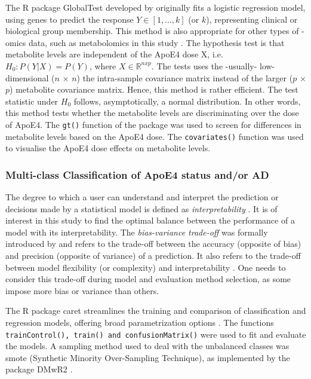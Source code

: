 \documentclass{amsart}
\theoremstyle{plain}
\begin{document}
The R package \textsf{GlobalTest} \cite{Goeman2004AOutcome, Goeman2006TestingAlternative, Goeman2023ThePackage} developed by \citeauthor{Goeman2004AOutcome} originally fits a logistic regression model, using genes to predict the response $Y \in [1,..., k]$ (or $k$), representing clinical or biological group membership. This method is also appropriate for other types of -omics data, such as metabolomics in this study \cite{Goeman2023ThePackage}.
The hypothesis test is that metabolite levels are independent of the ApoE4 dose X, i.e. $H_0 : P(Y|X) = P(Y)$, where $X \in \mathbb{R}^{n x p}$. The tests uses the -usually- low-dimensional ($n$ × $n$) the intra-sample covariance matrix instead of the larger ($p$ × $p$) metabolite covariance matrix. Hence, this method is rather efficient. The test statistic under $H_0$ follows, asymptotically, a normal distribution. In other words, this method tests whether the metabolite levels are discriminating over the dose of ApoE4. The \texttt{gt()} function of the package was used to screen for differences in metabolite levels based on the ApoE4 dose. The \texttt{covariates()} function was used to visualise the ApoE4 dose effects on metabolite levels.

\subsubsection{Multi-class Classification of ApoE4 status and/or AD}
The degree to which a user can understand and interpret the prediction or decisions made by a statistical model is defined as \textit{interpretability} \cite{Elshawi2019OnHypertension}. It is of interest in this study to find the optimal balance between the performance of a model with its interpretability. The \textit{bias-variance trade-off} was formally introduced by \citeauthor{Geman1992NeuralDilemma} and refers to the trade-off between the accuracy (opposite of bias) and precision (opposite of variance) of a prediction. It also refers to the trade-off between model flexibility (or complexity) and interpretability \cite{Geman1992NeuralDilemma}. One needs to consider this trade-off during model and evaluation method selection, as some impose more bias or variance than others.

The R package \textsf{caret} streamlines the training and comparison of classification and regression models, offering broad parametrization options \cite{Kuhn2008BuildingPackage}. The functions \texttt{trainControl(), train() and confusionMatrix()} were used to fit and evaluate the models. A sampling method used to deal with the unbalanced classes was \acrshort{smote} (Synthetic Minority Over-Sampling Technique), as implemented by the package \textsf{DMwR2} \cite{DMwR2}.
\end{document}
